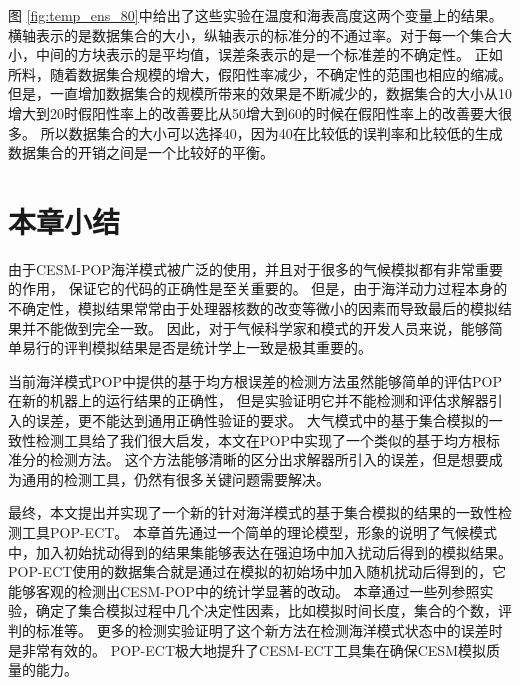 图 \ref{fig:temp_ens_80}中给出了这些实验在温度和海表高度这两个变量上的结果。 
横轴表示的是数据集合的大小，纵轴表示的标准分的不通过率。对于每一个集合大小，中间的方块表示的是平均值，误差条表示的是一个标准差的不确定性。
正如所料，随着数据集合规模的增大，假阳性率减少，不确定性的范围也相应的缩减。 
但是，一直增加数据集合的规模所带来的效果是不断减少的，数据集合的大小从10增大到20时假阳性率上的改善要比从50增大到60的时候在假阳性率上的改善要大很多。 
所以数据集合的大小可以选择40，因为40在比较低的误判率和比较低的生成数据集合的开销之间是一个比较好的平衡。 
 

\section{本章小结}
\label{verify:Conclusion}

由于CESM-POP海洋模式被广泛的使用，并且对于很多的气候模拟都有非常重要的作用，
保证它的代码的正确性是至关重要的。 
但是，由于海洋动力过程本身的不确定性，模拟结果常常由于处理器核数的改变等微小的因素而导致最后的模拟结果并不能做到完全一致。
因此，对于气候科学家和模式的开发人员来说，能够简单易行的评判模拟结果是否是统计学上一致是极其重要的。

当前海洋模式POP中提供的基于均方根误差的检测方法虽然能够简单的评估POP在新的机器上的运行结果的正确性，
但是实验证明它并不能检测和评估求解器引入的误差，更不能达到通用正确性验证的要求。
大气模式中的基于集合模拟的一致性检测工具给了我们很大启发，本文在POP中实现了一个类似的基于均方根标准分的检测方法。
这个方法能够清晰的区分出求解器所引入的误差，但是想要成为通用的检测工具，仍然有很多关键问题需要解决。 


最终，本文提出并实现了一个新的针对海洋模式的基于集合模拟的结果的一致性检测工具POP-ECT。
本章首先通过一个简单的理论模型，形象的说明了气候模式中，加入初始扰动得到的结果集能够表达在强迫场中加入扰动后得到的模拟结果。
POP-ECT使用的数据集合就是通过在模拟的初始场中加入随机扰动后得到的，它能够客观的检测出CESM-POP中的统计学显著的改动。
本章通过一些列参照实验，确定了集合模拟过程中几个决定性因素，比如模拟时间长度，集合的个数，评判的标准等。
更多的检测实验证明了这个新方法在检测海洋模式状态中的误差时是非常有效的。 
POP-ECT极大地提升了CESM-ECT工具集在确保CESM模拟质量的能力。



